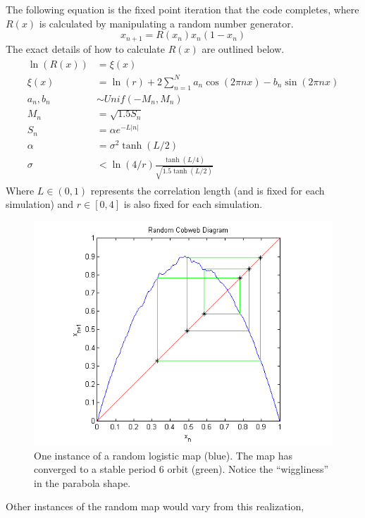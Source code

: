 \documentclass[12pt]{article}
\begin{document}
The following equation is the fixed point iteration that the code
completes, where $R(x)$ is calculated by manipulating a random number generator.
\begin{equation*}
x_{n+1} = R(x_n)x_n(1-x_n)
\end{equation*}
The exact details of how to calculate $R(x)$ are outlined below.
\begin{align*}
\begin{split}
\ln(R(x)) &= \xi(x)\\
\xi(x) &= \ln(r) + 2\sum^N_{n=1}a_n\cos(2\pi nx)-b_n\sin(2\pi nx)\\
a_n,b_n &\sim Unif(-M_n,M_n)\\
M_n &= \sqrt{1.5S_n}\\
S_n &= \alpha e^{-L|n|}\\
\alpha &= \sigma^2 \tanh(L/2)\\
\sigma &< \ln(4/r)\frac{\tanh(L/4)}{\sqrt{1.5\tanh(L/2)}}
\end{split}
\end{align*}
Where $L \in (0,1)$ represents the correlation length (and is fixed
for each simulation) and $r \in [0,4]$ is also fixed for each
simulation. 
\begin{figure}[H]
	\begin{center}
		\includegraphics[scale=0.7]{rand_cobweb}
\caption{One instance of a random logistic map (blue). The map has
  converged to a stable period 6 orbit (green). Notice the
  ``wiggliness'' in the parabola shape.}
	\end{center}
\end{figure}
Other instances of the random map would vary from this realization,
\end{document}
